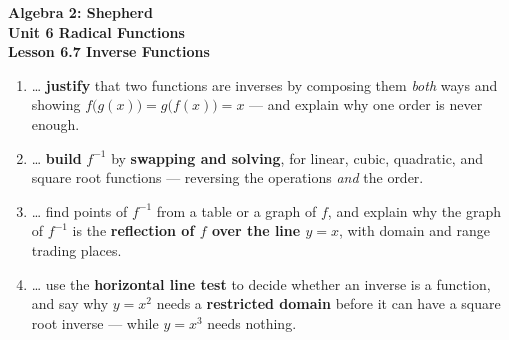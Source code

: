 \documentclass[10pt]{article}
\begin{document}
\vspace{-0.8in}

\begin{center}
  {\color{white}\textbf{\LARGE Algebra 2: Shepherd}}\\[4pt]
  {\color{forestmid}\large\textbf{Unit 6 \quad Radical Functions}}\\[6pt]
  {\color{white}\textbf{\large Lesson 6.7 \quad Inverse Functions}}
\end{center}

\vspace{0.22in}
\namedateperiod
\vspace{0.18in}

\begin{learningtargetbox}
\small
\begin{enumerate}[leftmargin=1.5em, itemsep=5pt]
  \item \ldots{} \textbf{justify} that two functions are inverses by composing them \emph{both} ways and showing $f\big(g(x)\big)=g\big(f(x)\big)=x$ --- and explain why one order is never enough.
  \item \ldots{} \textbf{build} $f^{-1}$ by \textbf{swapping and solving}, for linear, cubic, quadratic, and square root functions --- reversing the operations \emph{and} the order.
  \item \ldots{} find points of $f^{-1}$ from a table or a graph of $f$, and explain why the graph of $f^{-1}$ is the \textbf{reflection of $f$ over the line $y=x$}, with domain and range trading places.
  \item \ldots{} use the \textbf{horizontal line test} to decide whether an inverse is a function, and say why $y=x^{2}$ needs a \textbf{restricted domain} before it can have a square root inverse --- while $y=x^{3}$ needs nothing.
\end{enumerate}
\end{learningtargetbox}

\vspace{0.14in}
\end{document}
